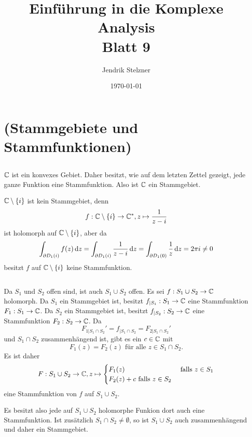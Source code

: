 \documentclass[a4paper,10pt]{article}
\title{Einführung in die Komplexe Analysis \\ \Large Blatt 9}
\author{Jendrik Stelzner}
\date{\today}
\begin{document}
\maketitle




\section{(Stammgebiete und Stammfunktionen)}


\subsection{}
$\mathbb{C}$ ist ein konvexes Gebiet. Daher besitzt, wie auf dem letzten Zettel gezeigt, jede ganze Funktion eine Stammfunktion. Also ist $\mathbb{C}$ ein Stammgebiet.

$\mathbb{C} \setminus \{i\}$ ist kein Stammgebiet, denn
\[
 f : \mathbb{C} \setminus \{i\} \to \mathbb{C}^*, z \mapsto \frac{1}{z-i}
\]
ist holomorph auf $\mathbb{C} \setminus \{i\}$, aber da
\[
 \int_{\partial D_1(i)} f(z) \,\text{d}z
 = \int_{\partial D_1(i)} \frac{1}{z-i} \,\text{d}z
 = \int_{\partial D_1(0)} \frac{1}{z} \,\text{d}z
 = 2 \pi i
 \neq 0
\]
besitzt $f$ auf $\mathbb{C} \setminus \{i\}$ keine Stammfunktion.


\subsection{}
Da $S_1$ und $S_2$ offen sind, ist auch $S_1 \cup S_2$ offen. Es sei $f : S_1 \cup S_2 \to \mathbb{C}$ holomorph. Da $S_1$ ein Stammgebiet ist, besitzt $f_{|S_1} : S_1 \to \mathbb{C}$ eine Stammfunktion $F_1 : S_1 \to \mathbb{C}$. Da $S_2$ ein Stammgebiet ist, besitzt $f_{|S_2} : S_2 \to \mathbb{C}$ eine Stammfunktion $F_2 : S_2 \to \mathbb{C}$. Da
\[
 F_{1 | S_1 \cap S_2}' = f_{|S_1 \cap S_2} = F_{2 | S_1 \cap S_2}'
\]
und $S_1 \cap S_2$ zusammenhängend ist, gibt es ein $c \in \mathbb{C}$ mit
\[
 F_1(z) = F_2(z) \text{ für alle } z \in S_1 \cap S_2.
\]
Es ist daher
\[
 F : S_1 \cup S_2 \to \mathbb{C},
 z \mapsto \begin{cases} F_1(z) & \text{ falls } z \in S_1 \\ F_2(z) + c \text{ falls } z \in S_2 \end{cases}
\]
eine Stammfunktion von $f$ auf $S_1 \cup S_2$.

Es besitzt also jede auf $S_1 \cup S_2$ holomorphe Funkion dort auch eine Stammfunktion. Ist zusätzlich $S_1 \cap S_2 \neq \emptyset$, so ist $S_1 \cup S_2$ auch zusammenhängend und daher ein Stammgebiet.
\end{document}
